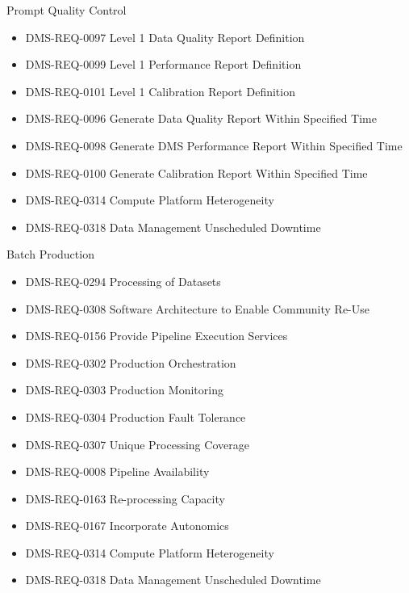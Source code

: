 Prompt Quality Control \begin{itemize}
\item DMS-REQ-0097 Level 1 Data Quality Report Definition
\item DMS-REQ-0099 Level 1 Performance Report Definition
\item DMS-REQ-0101 Level 1 Calibration Report Definition
\item DMS-REQ-0096 Generate Data Quality Report Within Specified Time
\item DMS-REQ-0098 Generate DMS Performance Report Within Specified Time
\item DMS-REQ-0100 Generate Calibration Report Within Specified Time
\item DMS-REQ-0314 Compute Platform Heterogeneity
\item DMS-REQ-0318 Data Management Unscheduled Downtime
\end{itemize}
Batch Production \begin{itemize}
\item DMS-REQ-0294 Processing of Datasets
\item DMS-REQ-0308 Software Architecture to Enable Community Re-Use
\item DMS-REQ-0156 Provide Pipeline Execution Services
\item DMS-REQ-0302 Production Orchestration
\item DMS-REQ-0303 Production Monitoring
\item DMS-REQ-0304 Production Fault Tolerance
\item DMS-REQ-0307 Unique Processing Coverage
\item DMS-REQ-0008 Pipeline Availability
\item DMS-REQ-0163 Re-processing Capacity
\item DMS-REQ-0167 Incorporate Autonomics
\item DMS-REQ-0314 Compute Platform Heterogeneity
\item DMS-REQ-0318 Data Management Unscheduled Downtime
\end{itemize}
